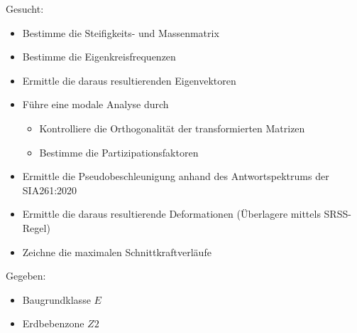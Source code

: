 \documentclass[
  letterpaper,
  DIV=11]{scrreprt}
\providecommand{\tightlist}{%
  \setlength{\itemsep}{0pt}\setlength{\parskip}{0pt}}\usepackage{longtable,booktabs,array}
\begin{document}
Gesucht:

\begin{itemize}
\tightlist
\item
  Bestimme die Steifigkeits- und Massenmatrix
\item
  Bestimme die Eigenkreisfrequenzen
\item
  Ermittle die daraus resultierenden Eigenvektoren
\item
  Führe eine modale Analyse durch

  \begin{itemize}
  \tightlist
  \item
    Kontrolliere die Orthogonalität der transformierten Matrizen
  \item
    Bestimme die Partizipationsfaktoren
  \end{itemize}
\item
  Ermittle die Pseudobeschleunigung anhand des Antwortspektrums der
  SIA261:2020
\item
  Ermittle die daraus resultierende Deformationen (Überlagere mittels
  SRSS-Regel)
\item
  Zeichne die maximalen Schnittkraftverläufe
\end{itemize}

Gegeben:

\begin{itemize}
\tightlist
\item
  Baugrundklasse \(E\)
\item
  Erdbebenzone \(Z2\)
\end{itemize}
\end{document}

